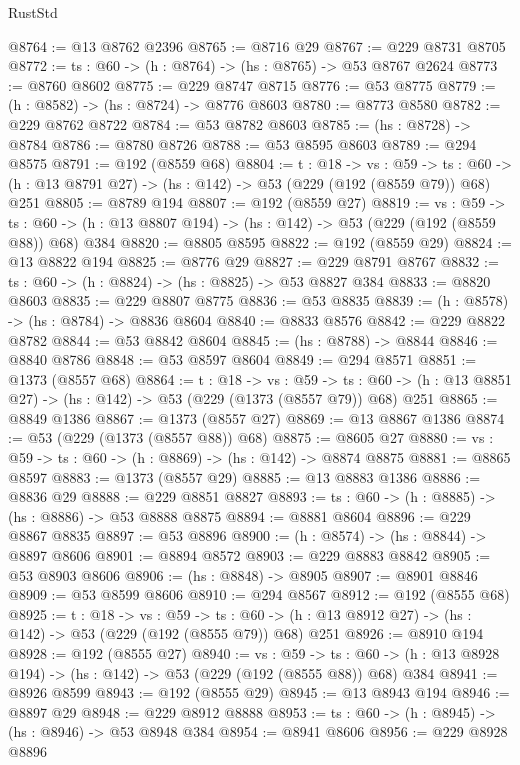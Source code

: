 \begin{lexlean}{RustStd}
\begin{coremodule}
@8764 := @13 @8762 @2396
@8765 := @8716 @29
@8767 := @229 @8731 @8705
@8772 := {ts : @60} -> (h : @8764) -> (hs : @8765) -> @53 @8767 @2624
@8773 := @8760 @8602
@8775 := @229 @8747 @8715
@8776 := @53 @8775
@8779 := (h : @8582) -> (hs : @8724) -> @8776 @8603
@8780 := @8773 @8580
@8782 := @229 @8762 @8722
@8784 := @53 @8782 @8603
@8785 := (hs : @8728) -> @8784
@8786 := @8780 @8726
@8788 := @53 @8595 @8603
@8789 := @294 @8575
@8791 := @192 (@8559 @68)
@8804 := {t : @18} ->
  {vs : @59} ->
  {ts : @60} -> (h : @13 @8791 @27) -> (hs : @142) -> @53 (@229 (@192 (@8559 @79)) @68) @251
@8805 := @8789 @194
@8807 := @192 (@8559 @27)
@8819 := {vs : @59} ->
  {ts : @60} -> (h : @13 @8807 @194) -> (hs : @142) -> @53 (@229 (@192 (@8559 @88)) @68) @384
@8820 := @8805 @8595
@8822 := @192 (@8559 @29)
@8824 := @13 @8822 @194
@8825 := @8776 @29
@8827 := @229 @8791 @8767
@8832 := {ts : @60} -> (h : @8824) -> (hs : @8825) -> @53 @8827 @384
@8833 := @8820 @8603
@8835 := @229 @8807 @8775
@8836 := @53 @8835
@8839 := (h : @8578) -> (hs : @8784) -> @8836 @8604
@8840 := @8833 @8576
@8842 := @229 @8822 @8782
@8844 := @53 @8842 @8604
@8845 := (hs : @8788) -> @8844
@8846 := @8840 @8786
@8848 := @53 @8597 @8604
@8849 := @294 @8571
@8851 := @1373 (@8557 @68)
@8864 := {t : @18} ->
  {vs : @59} ->
  {ts : @60} -> (h : @13 @8851 @27) -> (hs : @142) -> @53 (@229 (@1373 (@8557 @79)) @68) @251
@8865 := @8849 @1386
@8867 := @1373 (@8557 @27)
@8869 := @13 @8867 @1386
@8874 := @53 (@229 (@1373 (@8557 @88)) @68)
@8875 := @8605 @27
@8880 := {vs : @59} -> {ts : @60} -> (h : @8869) -> (hs : @142) -> @8874 @8875
@8881 := @8865 @8597
@8883 := @1373 (@8557 @29)
@8885 := @13 @8883 @1386
@8886 := @8836 @29
@8888 := @229 @8851 @8827
@8893 := {ts : @60} -> (h : @8885) -> (hs : @8886) -> @53 @8888 @8875
@8894 := @8881 @8604
@8896 := @229 @8867 @8835
@8897 := @53 @8896
@8900 := (h : @8574) -> (hs : @8844) -> @8897 @8606
@8901 := @8894 @8572
@8903 := @229 @8883 @8842
@8905 := @53 @8903 @8606
@8906 := (hs : @8848) -> @8905
@8907 := @8901 @8846
@8909 := @53 @8599 @8606
@8910 := @294 @8567
@8912 := @192 (@8555 @68)
@8925 := {t : @18} ->
  {vs : @59} ->
  {ts : @60} -> (h : @13 @8912 @27) -> (hs : @142) -> @53 (@229 (@192 (@8555 @79)) @68) @251
@8926 := @8910 @194
@8928 := @192 (@8555 @27)
@8940 := {vs : @59} ->
  {ts : @60} -> (h : @13 @8928 @194) -> (hs : @142) -> @53 (@229 (@192 (@8555 @88)) @68) @384
@8941 := @8926 @8599
@8943 := @192 (@8555 @29)
@8945 := @13 @8943 @194
@8946 := @8897 @29
@8948 := @229 @8912 @8888
@8953 := {ts : @60} -> (h : @8945) -> (hs : @8946) -> @53 @8948 @384
@8954 := @8941 @8606
@8956 := @229 @8928 @8896

\end{coremodule}
\end{lexlean}

